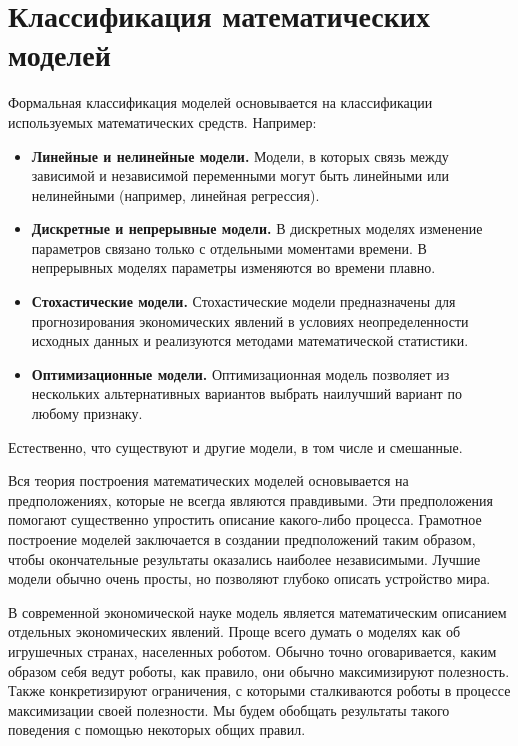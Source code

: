 \section{Классификация математических моделей}

Формальная классификация моделей основывается на классификации используемых математических средств.
Например:
\begin{itemize}
	\item \textbf{Линейные и нелинейные модели.}
	Модели, в которых связь между зависимой и независимой переменными могут быть линейными или нелинейными (например, линейная регрессия).
	\item \textbf{Дискретные и непрерывные модели.}
	В дискретных моделях изменение параметров связано только с отдельными моментами времени.
	В непрерывных моделях параметры изменяются во времени плавно.
	\item \textbf{Стохастические модели.}
	Стохастические модели предназначены для прогнозирования экономических явлений в условиях неопределенности исходных данных и реализуются методами математической статистики.
	\item \textbf{Оптимизационные модели.}
	Оптимизационная модель позволяет из нескольких альтернативных вариантов выбрать наилучший вариант по любому признаку.
\end{itemize}
Естественно, что существуют и другие модели, в том числе и смешанные.

Вся теория построения математических моделей основывается на предположениях, которые не всегда являются правдивыми.
Эти предположения помогают существенно упростить описание какого-либо процесса.
Грамотное построение моделей заключается в создании предположений таким образом, чтобы окончательные результаты оказались наиболее независимыми.
Лучшие модели обычно очень просты, но позволяют глубоко описать устройство мира.

В современной экономической науке модель является математическим описанием отдельных экономических явлений.
Проще всего думать о моделях как об игрушечных странах, населенных роботом.
Обычно точно оговаривается, каким образом себя ведут роботы, как правило, они обычно максимизируют полезность.
Также конкретизируют ограничения, с которыми сталкиваются роботы в процессе максимизации своей полезности.
Мы будем обобщать результаты такого поведения с помощью некоторых общих правил.
